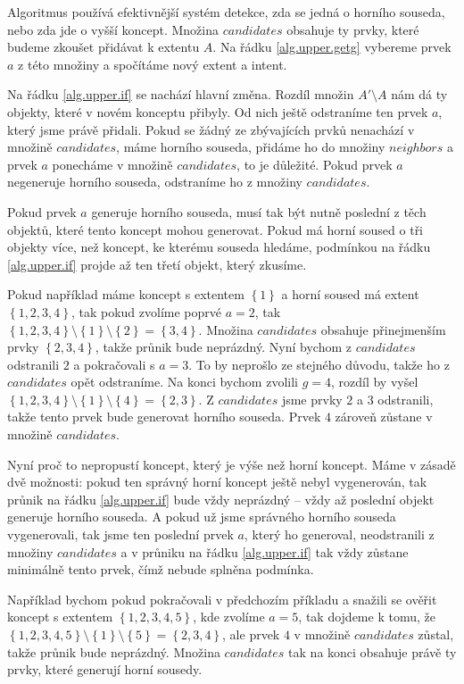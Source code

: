 \documentclass[12pt]{article}
\newcommand{\adds}[1]{\left\{#1\right\}}
\begin{document}
Algoritmus používá efektivnější systém detekce, zda se jedná o horního souseda, nebo zda jde o vyšší koncept. Množina $candidates$ obsahuje ty prvky, které budeme zkoušet přidávat k extentu $A$. Na řádku \ref{alg.upper.getg} vybereme prvek $a$ z této množiny a spočítáme nový extent a intent. 

Na řádku \ref{alg.upper.if} se nachází hlavní změna. Rozdíl množin $A'\setminus A$ nám dá ty objekty, které v novém konceptu přibyly. Od nich ještě odstraníme ten prvek $a$, který jsme právě přidali. Pokud se žádný ze zbývajících prvků nenachází v množině $candidates$, máme horního souseda, přidáme ho do množiny $neighbors$ a prvek $a$ ponecháme v množině $candidates$, to je důležité. Pokud prvek $a$ negeneruje horního souseda, odstraníme ho z množiny $candidates$.

Pokud prvek $a$ generuje horního souseda, musí tak být nutně poslední z těch objektů, které tento koncept mohou generovat. Pokud má horní soused o tři objekty více, než koncept, ke kterému souseda hledáme, podmínkou na řádku \ref{alg.upper.if} projde až ten třetí objekt, který zkusíme. 

Pokud například máme koncept s extentem $\adds{1}$ a horní soused má extent $\adds{1,2,3,4}$, tak pokud zvolíme poprvé $a=2$, tak $\adds{1,2,3,4} \setminus \adds{1} \setminus \adds{2} = \adds{3, 4}$. Množina $candidates$ obsahuje přinejmenším prvky $\adds{2, 3, 4}$, takže průnik bude neprázdný. Nyní bychom z $candidates$ odstranili $2$ a pokračovali s $a=3$. To by neprošlo ze stejného důvodu, takže ho z $candidates$ opět odstraníme. Na konci bychom zvolili $g=4$, rozdíl by vyšel $\adds{1,2,3,4} \setminus \adds{1} \setminus \adds{4} = \adds{2, 3}$. Z $candidates$ jsme prvky $2$ a $3$ odstranili, takže tento prvek bude generovat horního souseda. Prvek $4$ zároveň zůstane v množině $candidates$.

Nyní proč to nepropustí koncept, který je výše než horní koncept. Máme v zásadě dvě možnosti: pokud ten správný horní koncept ještě nebyl vygenerován, tak průnik na řádku \ref{alg.upper.if} bude vždy neprázdný -- vždy až poslední objekt generuje horního souseda. A pokud už jsme správného horního souseda vygenerovali, tak jsme ten poslední prvek $a$, který ho generoval, neodstranili z množiny $candidates$ a v průniku na řádku \ref{alg.upper.if} tak vždy zůstane minimálně tento prvek, čímž nebude splněna podmínka. 

Například bychom pokud pokračovali v předchozím příkladu a snažili se ověřit koncept s extentem $\adds{1,2,3,4,5}$, kde zvolíme $a=5$, tak dojdeme k tomu, že $\adds{1,2,3,4,5} \setminus \adds{1} \setminus \adds{5} = \adds{2,3,4}$, ale prvek $4$ v množině $candidates$ zůstal, takže průnik bude neprázdný. Množina $candidates$ tak na konci obsahuje právě ty prvky, které generují horní sousedy. 
\end{document}
